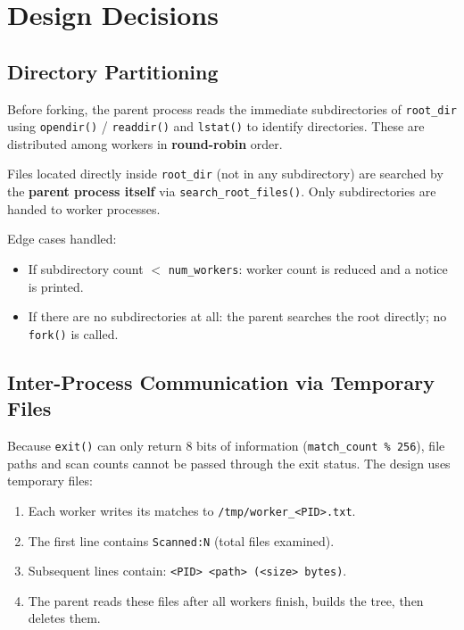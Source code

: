 \documentclass[12pt,a4paper]{article}
\begin{document}
\newpage

\section{Design Decisions}

\subsection{Directory Partitioning}

Before forking, the parent process reads the immediate subdirectories of
\texttt{root\_dir} using \texttt{opendir()} / \texttt{readdir()} and
\texttt{lstat()} to identify directories.
These are distributed among workers in \textbf{round-robin} order.

\begin{infobox}
Files located directly inside \texttt{root\_dir} (not in any subdirectory) are
searched by the \textbf{parent process itself} via \texttt{search\_root\_files()}.
Only subdirectories are handed to worker processes.
\end{infobox}

Edge cases handled:
\begin{itemize}
    \item If subdirectory count $<$ \texttt{num\_workers}: worker count is
          reduced and a notice is printed.
    \item If there are no subdirectories at all: the parent searches the root
          directly; no \texttt{fork()} is called.
\end{itemize}

\subsection{Inter-Process Communication via Temporary Files}

Because \texttt{exit()} can only return 8 bits of information
(\texttt{match\_count \% 256}), file paths and scan counts cannot be passed
through the exit status. The design uses temporary files:

\begin{enumerate}
    \item Each worker writes its matches to \texttt{/tmp/worker\_<PID>.txt}.
    \item The first line contains \texttt{Scanned:N} (total files examined).
    \item Subsequent lines contain: \texttt{<PID> <path> (<size> bytes)}.
    \item The parent reads these files after all workers finish, builds the
          tree, then deletes them.
\end{enumerate}
\end{document}

